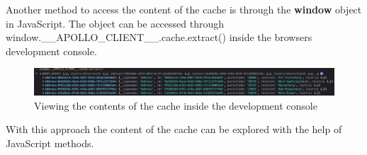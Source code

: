 Another method to access the content of the cache is through the \textbf{window} object in JavaScript. The object can be accessed through window.\_\_APOLLO\_CLIENT\_\_.cache.extract() inside the browsers development console.

\ifshowImages
  \begin{figure}[H]
  \centering
  \includegraphics[width=1\linewidth]{images/background/apollo/apollo-cache-browser-window.jpeg}
  \caption{Viewing the contents of the cache inside the development console}\label{fig:background:graphql:apollo:apollo-cache-browser-window}
  \end{figure}
\fi

With this approach the content of the cache can be explored with the help of JavaScript methods.
